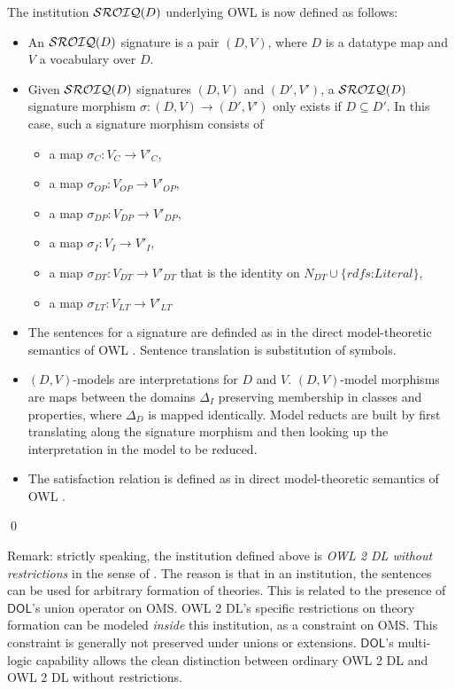 \documentclass[10pt, a4paper]{isov2}
\newcommand*{\DOL}{\ensuremath{\mathsf{DOL}}\xspace}
\begin{document}
The institution $\mathcal{SROIQ}(D)$ underlying OWL is now defined as follows:
\begin{definition}
\begin{itemize}
\item An $\mathcal{SROIQ}(D)$ signature is a pair $(D,V)$, where $D$ is a
  datatype map and $V$ a vocabulary over $D$.
\item Given $\mathcal{SROIQ}(D)$ signatures $(D,V)$ and $(D',V')$, a
  $\mathcal{SROIQ}(D)$ signature morphism $\sigma\colon (D,V)\to(D',V')$ only
  exists if $D\subseteq D'$. In this case, such a signature morphism
  consists of
\begin{itemize}
\item a map $\sigma_C\colon V_{C}\to V'_{C}$,
\item a map $\sigma_{OP}\colon V_{OP}\to V'_{OP}$,
\item a map $\sigma_{DP}\colon V_{DP}\to V'_{DP}$,
\item a map $\sigma_I\colon V_{I}\to V'_{I}$,
\item a map $\sigma_{DT}\colon V_{DT}\to V'_{DT}$ that is the identity
on $N_{DT} \cup \{ \textit{rdfs:Literal} \}$,
\item a map $\sigma_{LT}\colon V_{LT}\to V'_{LT}$ 

\end{itemize}
\item The sentences for a signature are definded as in
the direct model-theoretic semantics of OWL \cite{w3c:owl2-direct-semantics}. Sentence translation is substitution of symbols.
\item  $(D,V)$-models are interpretations for $D$ and $V$. 
$(D,V)$-model morphisms are maps between the domains $\Delta_I$ preserving membership in classes and properties, where $\Delta_D$ is mapped identically. Model reducts are built by first translating along the signature morphism and then
looking up the interpretation in the model to be reduced.  
\item The satisfaction relation is defined as in direct model-theoretic semantics of OWL \cite{w3c:owl2-direct-semantics}.
\end{itemize}
\qed\end{definition}


Remark: strictly speaking, the institution defined above is
\emph{{OWL} 2 DL without restrictions} in the sense of
\cite{DBLP:conf/owled/SchneiderRS13}. The reason is that in an
institution, the sentences can be used for arbitrary formation of
theories. This is related to the presence of \DOL's union operator on
OMS.  OWL 2 DL's specific restrictions on theory formation can be
modeled \emph{inside} this institution, as a constraint on OMS.  This
constraint is generally not preserved under unions or
extensions. \DOL's multi-logic capability allows the clean distinction
between ordinary OWL 2 DL and {OWL} 2 DL without restrictions.
\end{document}
